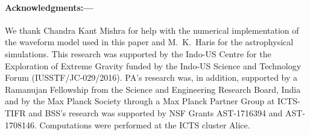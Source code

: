 \documentclass[prl,preprintnumbers,twocolumn,eqsecnum,floatfix,a4paper,nofootinbib,superscriptaddress]{revtex4}
\begin{document}
\paragraph{Acknowledgments:---}
We thank Chandra Kant Mishra for help with the numerical implementation of the waveform model used in this paper and M.~K.~Haris for the astrophysical simulations. This research was supported by the Indo-US Centre for the Exploration of Extreme Gravity funded by the Indo-US Science and Technology Forum (IUSSTF/JC-029/2016). PA's research was, in addition, supported by a Ramanujan Fellowship from the Science and Engineering Research Board, India and by the Max Planck Society through a Max Planck Partner Group at ICTS-TIFR and BSS's research was supported by NSF Grants AST-1716394 and AST-1708146. Computations were performed at the ICTS cluster Alice. 

%


\end{document}
